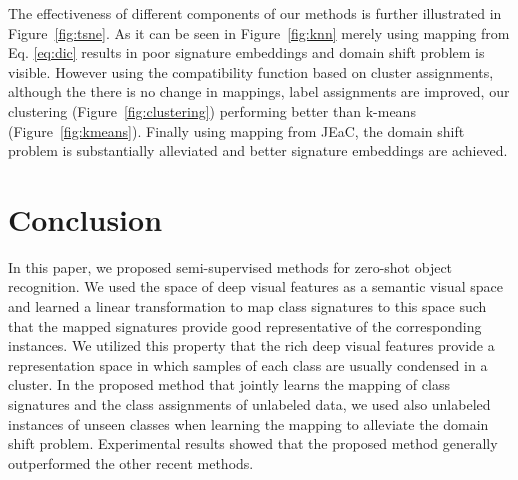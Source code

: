 \documentclass[letterpaper]{article}
\begin{document}
The effectiveness of different components of our methods is further illustrated in Figure~\ref{fig:tsne}. As it can be seen in
Figure~\ref{fig:knn} merely using mapping from Eq. \eqref{eq:dic} results in poor signature embeddings and domain shift problem is
visible. However using the compatibility function based on cluster assignments, although the there is no change in mappings,
label assignments are improved, our clustering  (Figure~\ref{fig:clustering}) performing  better than k-means (Figure~\ref{fig:kmeans}). Finally using
mapping from JEaC, the domain shift problem is substantially alleviated and better signature embeddings are achieved.
%
%
%
%
\section{Conclusion} \label{conclusion}
In this paper, we proposed semi-supervised methods for zero-shot object recognition.
We used the space of deep visual features as a semantic visual space and learned a linear transformation to map class signatures to this
space such that the mapped signatures provide good representative of the corresponding instances.
We utilized this property that the rich deep visual features provide a representation space in which samples of each class
are usually condensed in a cluster. In the proposed method that jointly learns the mapping of class signatures and the class assignments of unlabeled data,
we used also unlabeled instances of unseen classes when learning the mapping to alleviate the domain shift problem.
Experimental results showed that the proposed method generally outperformed the other recent methods.
{\small


}
\end{document}
